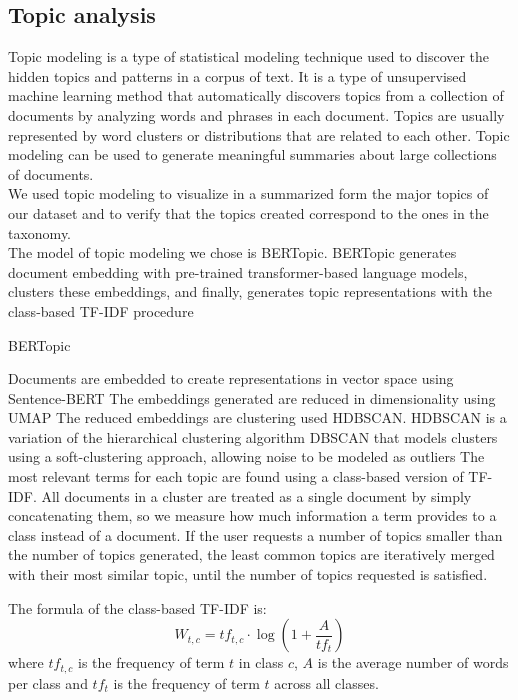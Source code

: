 
\subsection*{Topic analysis}
Topic modeling is a type of statistical modeling technique used to discover the hidden topics and patterns in a corpus of text. It is a type of unsupervised machine learning method that automatically discovers topics from a collection of documents by analyzing words and phrases in each document. Topics are usually represented by word clusters or distributions that are related to each other. Topic modeling can be used to generate meaningful summaries about large collections of documents. \\
We used topic modeling to visualize in a summarized form the major topics of our dataset and to verify that the topics created correspond to the ones in the taxonomy. \\
The model of topic modeling we chose is BERTopic\cite{grootendorst2022bertopic}. BERTopic generates document embedding with pre-trained transformer-based language models, clusters these embeddings, and finally, generates topic representations with the class-based TF-IDF procedure
\begin{algorithm}
    \caption*{BERTopic}
    \begin{algorithmic}[1]
      \State Documents are embedded to create representations in vector space using Sentence-BERT
      \State The embeddings generated are reduced in dimensionality using UMAP
      \State The reduced embeddings are clustering used HDBSCAN. HDBSCAN is a variation of the hierarchical clustering algorithm DBSCAN that models clusters using a soft-clustering approach, allowing noise to be modeled as outliers
      \State The most relevant terms for each topic are found using a class-based version of TF-IDF. All documents in a cluster are treated as a single document by simply concatenating them, so we measure how much information a term provides to a class instead of a document.
      \State If the user requests a number of topics smaller than the number of topics generated, the least common topics are iteratively merged with their most similar topic, until the number of topics requested is satisfied.
    \end{algorithmic}
\end{algorithm}

The formula of the class-based TF-IDF is:
\begin{equation*}
    W_{t,c} = tf_{t,c} \cdot \log(1 + \frac{A}{tf_{t}})
\end{equation*}
where $tf_{t,c}$ is the frequency of term $t$ in class $c$, $A$ is the average number of words per class and $tf_{t}$ is the frequency of term $t$ across all classes.

